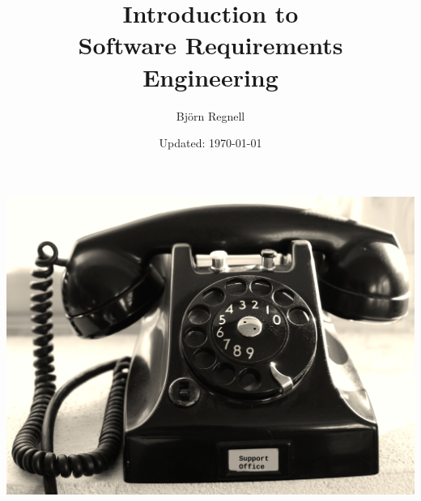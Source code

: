 \documentclass{reqengbook}
\title{
\bf\sffamily\fontsize{25}{30}\selectfont
Introduction to\\Software Requirements Engineering
}
\author{\sffamily\fontsize{20}{30}\selectfont Björn Regnell}
\date{\vspace{2em}\sffamily Updated: \today}
\begin{document}

\begin{minipage}{0.5\textwidth}
  \maketitle%
\end{minipage}%
\begin{minipage}{0.5\textwidth}
  \centering\vspace{2.2cm}
  \includegraphics[width=1.1\textwidth]{../../img/phone-support.jpg}%
\end{minipage}%
\pagebreak


\setcounter{tocdepth}{2}

\begin{multicols*}{2}  %
\footnotesize
\tableofcontents
\end{multicols*}



 
\end{document}
